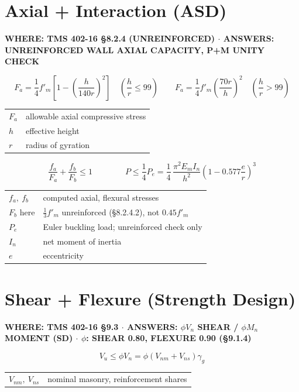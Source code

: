 \documentclass[10pt]{article}
\begin{document}
\section{Axial + Interaction (ASD)}

{\ttfamily\footnotesize\bfseries WHERE: TMS 402-16 \S 8.2.4 (UNREINFORCED) $\cdot$ ANSWERS: UNREINFORCED WALL AXIAL CAPACITY, P+M UNITY CHECK}

\begin{equation}
F_a = \frac{1}{4}f'_m\left[1 - \left(\frac{h}{140r}\right)^2\right] \quad \left(\frac{h}{r} \le 99\right) \qquad
F_a = \frac{1}{4}f'_m\left(\frac{70r}{h}\right)^2 \quad \left(\frac{h}{r} > 99\right)
\end{equation}
{\ttfamily\footnotesize \begin{tabular}{@{}ll@{}}
$F_a$ & allowable axial compressive stress\\
$h$ & effective height\\
$r$ & radius of gyration\\
\end{tabular}}

\begin{equation}
\frac{f_a}{F_a} + \frac{f_b}{F_b} \le 1 \qquad\qquad P \le \frac{1}{4}P_e = \frac{1}{4}\,\frac{\pi^2 E_m I_n}{h^2}\left(1 - 0.577\frac{e}{r}\right)^3
\end{equation}
{\ttfamily\footnotesize \begin{tabular}{@{}ll@{}}
$f_a,\ f_b$ & computed axial, flexural stresses\\
$F_b$ here & $\frac{1}{3}f'_m$ unreinforced (\S 8.2.4.2), not $0.45f'_m$\\
$P_e$ & Euler buckling load; unreinforced check only\\
$I_n$ & net moment of inertia\\
$e$ & eccentricity\\
\end{tabular}}

\section{Shear + Flexure (Strength Design)}

{\ttfamily\footnotesize\bfseries WHERE: TMS 402-16 \S 9.3 $\cdot$ ANSWERS: $\phi V_n$ SHEAR / $\phi M_n$ MOMENT (SD) $\cdot$ $\phi$: SHEAR 0.80, FLEXURE 0.90 (\S 9.1.4)}

\begin{equation}
V_u \le \phi V_n = \phi\left(V_{nm} + V_{ns}\right)\gamma_g
\end{equation}
{\ttfamily\footnotesize \begin{tabular}{@{}ll@{}}
$V_{nm},\ V_{ns}$ & nominal masonry, reinforcement shares\\
\end{tabular}}
\end{document}
